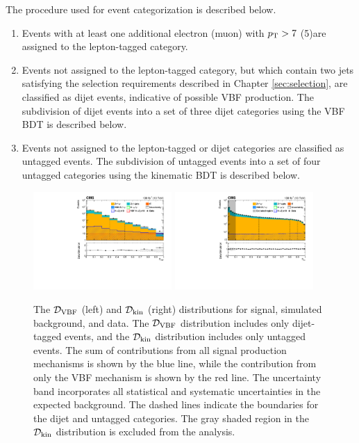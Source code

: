 The procedure used for event categorization is described below. 

\begin{enumerate}
  \item Events with at least one additional electron (muon) with $p_{\mathrm{T}}>7$ (5)\GeV are assigned to 
	  the lepton-tagged category.
  \item Events not assigned to the lepton-tagged category, but which contain two jets satisfying the 
	  selection requirements described in Chapter \ref{sec:selection}, are classified 
	  as dijet events, indicative of possible VBF production. 
	  The subdivision of dijet events into a set of three dijet categories using the VBF BDT is described below.
  \item Events not assigned to the lepton-tagged or dijet categories are classified as untagged events.
	The subdivision of untagged events into a set of four untagged categories using the kinematic BDT is described below.
\end{enumerate}

\begin{figure}[tbp!]
\centering
\includegraphics[width=0.47\textwidth]{fig/cat/Figure_002-a.pdf}
\includegraphics[width=0.47\textwidth]{fig/cat/Figure_002-b.pdf}
 \caption{The $\mathcal{D}_{\mathrm{VBF}}$ (left) and $\mathcal{D_{\mathrm{kin}}}$ (right) distributions for signal, simulated background, and data. 
	  The $\mathcal{D}_{\mathrm{VBF}}$ distribution includes
	  only dijet-tagged events, and the $\mathcal{D_{\mathrm{kin}}}$ distribution includes only untagged events. The sum of contributions from all signal production mechanisms is shown by the blue line, while the contribution from only the VBF mechanism is shown by the red line. The uncertainty band incorporates all statistical and systematic uncertainties in the expected background. The dashed lines indicate the boundaries for the dijet and untagged categories. The gray shaded region in the $\mathcal{D_{\mathrm{kin}}}$ distribution is excluded from the analysis.\label{fig:BDT}}
\end{figure}

